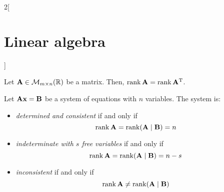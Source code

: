 \documentclass[../../../main.tex]{subfiles}
\begin{document}
\begin{multicols}{2}[\section{Linear algebra}]
\begin{definition}[Transposition]
    \end{definition}
    \begin{prop}
        Let $\boldsymbol{\mathrm{A}}\in\mathcal{M}_{m\times n}(\mathbb{R})$ be a matrix. Then, $\rank \boldsymbol{\mathrm{A}}=\rank\vb{A}^{\mathrm{T}}$.
    \end{prop}
    \begin{theorem}
        Let $\boldsymbol{\mathrm{A}}\boldsymbol{\mathrm{x}}=\boldsymbol{\mathrm{B}}$ be a system of equations with $n$ variables. The system is:
        \begin{itemize}
            \item \textit{determined and consistent} if and only if $$\rank \boldsymbol{\mathrm{A}}=\rank (\boldsymbol{\mathrm{A}}\mid \boldsymbol{\mathrm{B}})=n$$
            \item \textit{indeterminate with $s$ free variables} if and only if $$\rank \boldsymbol{\mathrm{A}}=\rank (\boldsymbol{\mathrm{A}}\mid \boldsymbol{\mathrm{B}})=n-s$$
            \item \textit{inconsistent} if and only if $$\rank \boldsymbol{\mathrm{A}}\ne\rank (\boldsymbol{\mathrm{A}}\mid \boldsymbol{\mathrm{B}})$$
        \end{itemize}
    \end{theorem}

\end{multicols}
\end{document}
